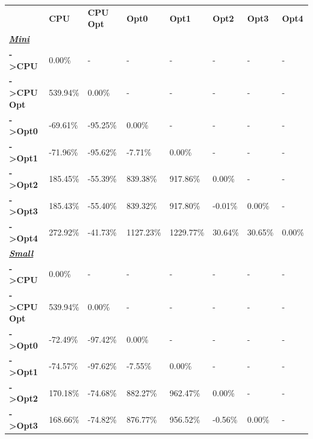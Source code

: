 \begin{table}[H]
    \centering
    \begin{tabular}{llllllll}
    \rowcolor[HTML]{DAE8FC} \ &  \textbf{CPU} &  \textbf{CPU Opt} &  \textbf{Opt0} &  \textbf{Opt1} &  \textbf{Opt2} &  \textbf{Opt3} &  \textbf{Opt4} \\
    \cellcolor[HTML]{DAE8FC} \textbf{\textbf{{\emph{{\underline{{Mini}}}}}}} &  &  &  &  &  &  &  \\
    \rowcolor[HTML]{EFEFEF} \cellcolor[HTML]{DAE8FC} \textbf{->CPU} & 0.00\% & - & - & - & - & - & - \\
    \cellcolor[HTML]{DAE8FC} \textbf{->CPU Opt} & 539.94\% & 0.00\% & - & - & - & - & - \\
    \rowcolor[HTML]{EFEFEF} \cellcolor[HTML]{DAE8FC} \textbf{->Opt0} & -69.61\% & -95.25\% & 0.00\% & - & - & - & - \\
    \cellcolor[HTML]{DAE8FC} \textbf{->Opt1} & -71.96\% & -95.62\% & -7.71\% & 0.00\% & - & - & - \\
    \rowcolor[HTML]{EFEFEF} \cellcolor[HTML]{DAE8FC} \textbf{->Opt2} & 185.45\% & -55.39\% & 839.38\% & 917.86\% & 0.00\% & - & - \\
    \cellcolor[HTML]{DAE8FC} \textbf{->Opt3} & 185.43\% & -55.40\% & 839.32\% & 917.80\% & -0.01\% & 	0.00\% & - \\
    \rowcolor[HTML]{EFEFEF} \cellcolor[HTML]{DAE8FC} \textbf{->Opt4} & 272.92\% & -41.73\% & 1127.23\% & 1229.77\% & 30.64\% & 	30.65\% & 	0.00\% \\
    \cellcolor[HTML]{DAE8FC} \textbf{\textbf{{\emph{{\underline{{Small}}}}}}} &  &  &  &  &  &  &  \\
    \rowcolor[HTML]{EFEFEF} \cellcolor[HTML]{DAE8FC} \textbf{->CPU} & 0.00\% & - & - & - & - & - & - \\
    \cellcolor[HTML]{DAE8FC} \textbf{->CPU Opt} & 539.94\% & 0.00\% & - & - & - & - & - \\
    \rowcolor[HTML]{EFEFEF} \cellcolor[HTML]{DAE8FC} \textbf{->Opt0} & -72.49\% & -97.42\% & 0.00\% & - & - & - & - \\
    \cellcolor[HTML]{DAE8FC} \textbf{->Opt1} & -74.57\% & -97.62\% & -7.55\% & 0.00\% & - & - & - \\
    \rowcolor[HTML]{EFEFEF} \cellcolor[HTML]{DAE8FC} \textbf{->Opt2} & 170.18\% & -74.68\% & 882.27\% & 962.47\% & 0.00\% & - & - \\
    \cellcolor[HTML]{DAE8FC} \textbf{->Opt3} & 168.66\% & -74.82\% & 876.77\% & 956.52\% & -0.56\% & 	0.00\% & - \\

\end{tabular}
\end{table}
